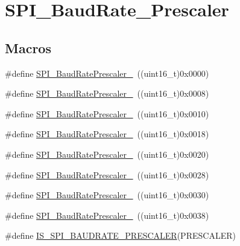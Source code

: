 \hypertarget{group___s_p_i___baud_rate___prescaler}{}\section{S\+P\+I\+\_\+\+Baud\+Rate\+\_\+\+Prescaler}
\label{group___s_p_i___baud_rate___prescaler}
\subsection*{Macros}
\begin{DoxyCompactItemize}
\item 
\#define \mbox{\hyperlink{group___s_p_i___baud_rate___prescaler_ga88cd6d416c87b382396dbf4c02e3bd4b}{S\+P\+I\+\_\+\+Baud\+Rate\+Prescaler\+\_}}~((uint16\+\_\+t)0x0000)
\item 
\#define \mbox{\hyperlink{group___s_p_i___baud_rate___prescaler_ga17ac4858cb9387289ee7c3d94a9b54be}{S\+P\+I\+\_\+\+Baud\+Rate\+Prescaler\+\_}}~((uint16\+\_\+t)0x0008)
\item 
\#define \mbox{\hyperlink{group___s_p_i___baud_rate___prescaler_ga023a1e4c04586f2feb0d4b03b2e0c230}{S\+P\+I\+\_\+\+Baud\+Rate\+Prescaler\+\_}}~((uint16\+\_\+t)0x0010)
\item 
\#define \mbox{\hyperlink{group___s_p_i___baud_rate___prescaler_ga5ef8587bb96e3ec98e9fde770756fc7d}{S\+P\+I\+\_\+\+Baud\+Rate\+Prescaler\+\_}}~((uint16\+\_\+t)0x0018)
\item 
\#define \mbox{\hyperlink{group___s_p_i___baud_rate___prescaler_ga1d30cecaa412cee5250c69644207c652}{S\+P\+I\+\_\+\+Baud\+Rate\+Prescaler\+\_}}~((uint16\+\_\+t)0x0020)
\item 
\#define \mbox{\hyperlink{group___s_p_i___baud_rate___prescaler_ga2c9cd96ed56432a83f8e4f46fbecb5e6}{S\+P\+I\+\_\+\+Baud\+Rate\+Prescaler\+\_}}~((uint16\+\_\+t)0x0028)
\item 
\#define \mbox{\hyperlink{group___s_p_i___baud_rate___prescaler_gafa6c39c3ee16a08730356a5cd30f3648}{S\+P\+I\+\_\+\+Baud\+Rate\+Prescaler\+\_}}~((uint16\+\_\+t)0x0030)
\item 
\#define \mbox{\hyperlink{group___s_p_i___baud_rate___prescaler_ga1e1aa6406f0e88ac557ba49fb8069e3e}{S\+P\+I\+\_\+\+Baud\+Rate\+Prescaler\+\_}}~((uint16\+\_\+t)0x0038)
\item 
\#define \mbox{\hyperlink{group___s_p_i___baud_rate___prescaler_gae79f46ed9f91e39dc1f6912cb25fc716}{I\+S\+\_\+\+S\+P\+I\+\_\+\+B\+A\+U\+D\+R\+A\+T\+E\+\_\+\+P\+R\+E\+S\+C\+A\+L\+ER}}(P\+R\+E\+S\+C\+A\+L\+ER)
\end{DoxyCompactItemize}


